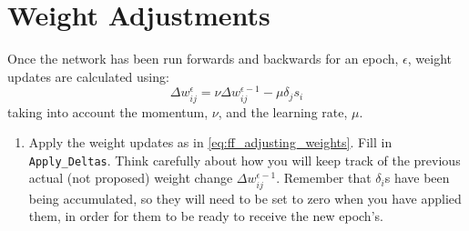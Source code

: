 \documentclass[a4paper,10pt]{article}
\begin{document}
\section{Weight Adjustments}
Once the network has been run forwards and backwards for an epoch, $\epsilon$, weight updates are calculated using:
\begin{equation}
\label{eq:ff_adjusting_weights}
\Delta w_{ij}^{\epsilon} = \nu \Delta w_{ij}^{\epsilon-1} - \mu \delta_j s_i 
\end{equation}
taking into account the momentum, $\nu$, and the learning rate, $\mu$.

\begin{enumerate}

\item Apply the weight updates as in \autoref{eq:ff_adjusting_weights}. Fill in \texttt{Apply\_Deltas}. Think carefully about how you will keep track of the previous actual (not proposed) weight change $\Delta w_{ij}^{\epsilon-1}$. Remember that $\delta_i$s have been being accumulated, so they will need to be set to zero when you have applied them, in order for them to be ready to receive the new epoch's.

 
 
 \end{enumerate}

\end{document}
